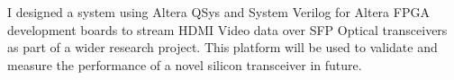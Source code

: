 \descript{ }
\vspace*{-\topsep}  %
\begin{justify}
I designed a system using Altera QSys and System Verilog for Altera FPGA development boards to stream HDMI Video data over SFP Optical transceivers as part of a wider research project. This platform will be used to validate and measure the performance of a novel silicon transceiver in future.
\end{justify}
\sectionsep